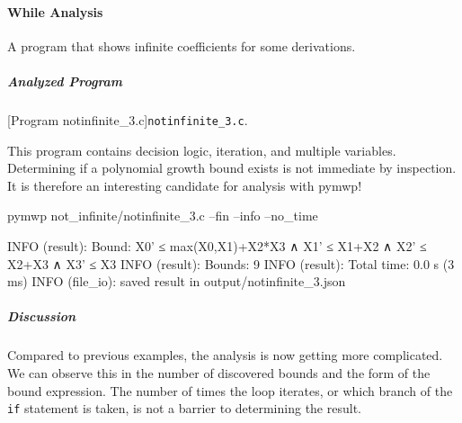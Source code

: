 \paragraph{While Analysis}\label{while-analysis}
A program that shows infinite coefficients for some derivations.

\subparagraph*{Analyzed Program}

\begin{center}
\begin{minipage}{\textwidth}
\captionsetup{type=lstlisting}
[Program notinfinite\_3.c]{\texttt{notinfinite\_3.c}.}
\label{lst:notinfinite3}
\end{minipage}
\end{center}

This program contains decision logic, iteration, and multiple variables.
Determining if a polynomial growth bound exists is not immediate by inspection.
It is therefore an interesting candidate for analysis with pymwp!

\begin{center}
\begin{minipage}{\textwidth}
\captionsetup{type=lstlisting}
\begin{cmdlisting}[label={lst:ex3-run-cmd}]
pymwp not_infinite/notinfinite_3.c --fin --info --no_time
\end{cmdlisting}
\end{minipage}
\end{center}

\begin{center}
\begin{minipage}{\textwidth}
\begin{outlisting}[label={lst:ex3-output}]
INFO (result): Bound: X0' ≤ max(X0,X1)+X2*X3 ∧ X1' ≤ X1+X2 ∧ X2' ≤ X2+X3 ∧ X3' ≤ X3
INFO (result): Bounds: 9
INFO (result): Total time: 0.0 s (3 ms)
INFO (file_io): saved result in output/notinfinite_3.json
\end{outlisting}
\end{minipage}
\end{center}

\subparagraph*{Discussion}\label{discussion}

Compared to previous examples, the analysis is now getting more complicated.
We can observe this in the number of discovered bounds and the form of the bound expression.
The number of times the loop iterates, or which branch of the \texttt{if} statement is taken, is not a barrier to determining the result.

